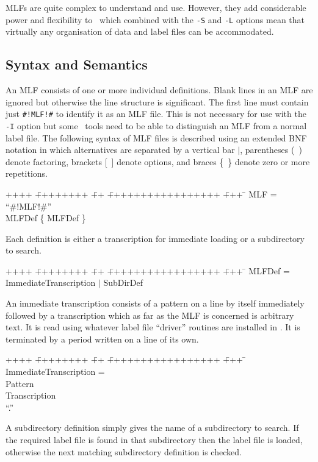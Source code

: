 MLFs are quite complex to understand and use.  However, they add
considerable power and flexibility to \HTK\ which combined with the
\texttt{-S} and 
\texttt{-L} 
options mean that virtually any organisation of
data and label files can be accommodated. 

\subsection{Syntax and Semantics}

An MLF consists of one or more individual definitions.  Blank lines in
an MLF are ignored but otherwise the line structure is significant.
The first line must contain just \texttt{\#!MLF!\#} to identify it as an MLF file.
This is not necessary for use with the \texttt{-I} option but some 
\HTK\ tools need to be able to distinguish an MLF from a normal label file.
The following syntax of MLF files is described using an 
extended BNF notation in which
alternatives are separated by a vertical bar $|$, parentheses (\ ) denote
factoring, brackets [\ ] denote options, and braces \{\ \} denote zero or more
repetitions. 

{\sf
\begin{tabbing}
++++ \= ++++++++ \= ++ \= +++++++++++++++++ \= +++ \=  \kill
\>    MLF  =  \> ``\#!MLF!\#'' \\
\>\>  MLFDef \{ MLFDef \}
\end{tabbing}
}

Each definition is either a transcription for immediate loading or a
subdirectory to search.

{\sf
\begin{tabbing}
++++ \= ++++++++ \= ++ \= +++++++++++++++++ \= +++ \=  \kill
\>    MLFDef  = \> ImmediateTranscription $|$ SubDirDef
\end{tabbing}
}

An immediate transcription consists of a pattern on a line
by itself immediately followed
by a transcription which as far as the MLF is concerned is arbitrary
text.  It is read using whatever label file ``driver'' routines are
installed in .  It is terminated by a period written on a line
of its own.

{\sf
\begin{tabbing}
++++ \= ++++++++ \= ++ \= +++++++++++++++++ \= +++ \=  \kill
\>   ImmediateTranscription = \\
\>\>                    Pattern \\
\>\>                    Transcription \\
\>\>``.'' 
\end{tabbing}
}
A subdirectory definition  simply gives the name of a subdirectory
to search.  If the required label file is found in that subdirectory
then the label file is loaded, otherwise the next matching subdirectory
definition is checked.

